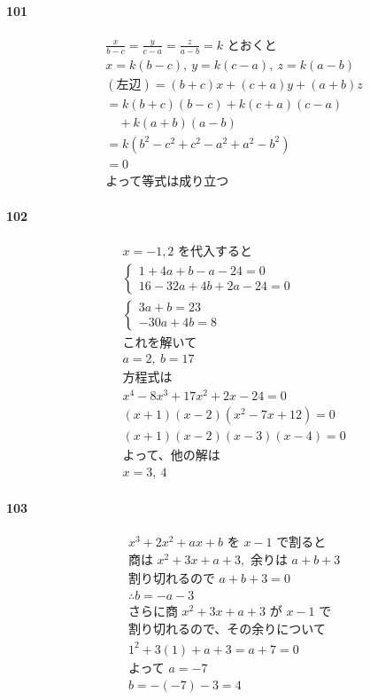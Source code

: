 \documentclass[fleqn,a4j,dvipdfmx,uplatex,twocolumn]{jsarticle}
\begin{document}
\paragraph{101}
\begin{align*}
  &\frac{x}{b-c} = \frac{y}{c-a} = \frac{z}{a-b} = k \text{ とおくと} \\
  &x = k(b-c), \ y = k(c-a), \ z = k(a-b) \\
  &(\text{左辺}) = (b+c)x + (c+a)y + (a+b)z \\
  &= k(b+c)(b-c) + k(c+a)(c-a) \\
  &\quad + k(a+b)(a-b) \\
  &= k(b^{2}-c^{2} + c^{2}-a^{2} + a^{2}-b^{2}) \\
  &= 0 \\
  &\text{よって等式は成り立つ}
\end{align*}

\paragraph{102}
\begin{align*}
  & x=-1, 2 \text{ を代入すると} \\
  &\begin{cases} 1+4a+b-a-24=0 \\ 16-32a+4 b+2a-24=0 \end{cases} \\
  &\begin{cases} 3a+b=23 \\ -30a+4b=8 \end{cases} \\
  &\text{これを解いて} \\
  &a=2, \ b=17 \\
  &\text{方程式は} \\
  &x^{4}-8x^{3}+17x^{2}+2x-24=0 \\
  &(x+1)(x-2)(x^{2}-7x+12)=0 \\
  &(x+1)(x-2)(x-3)(x-4)=0 \\
  &\text{よって、他の解は} \\
  &x=3, \ 4
\end{align*}

\paragraph{103}
\begin{align*}
  &x^3+2x^2+ax+b \text{ を } x-1 \text{ で割ると} \\
  &\text{商は } x^2+3x+a+3, \text{ 余りは } a+b+3 \\
  &\text{割り切れるので } a+b+3=0 \\
  &\therefore b=-a-3 \\
  &\text{さらに商 } x^2+3x+a+3 \text{ が } x-1 \text{ で} \\
  &\text{割り切れるので、その余りについて} \\
  &1^2+3(1)+a+3 = a+7 = 0 \\
  &\text{よって } a=-7 \\
  &b=-(-7)-3=4
\end{align*}
\end{document}

